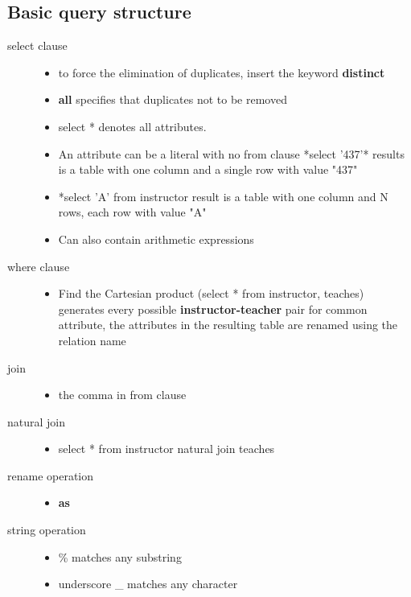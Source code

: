\documentclass[11pt]{article}
\begin{document}
\subsection{Basic query structure}
\label{sec-6-3}
\begin{description}
\item[{select clause}] \begin{itemize}
\item to force the elimination of duplicates, insert the keyword \textbf{distinct}
\item \textbf{all} specifies that duplicates not to be removed
\item select * denotes all attributes.
\item An attribute can be a literal with no from clause
*select '437'*
results is a table with one column and a single row with value "437"
\item *select 'A' from instructor
result is a table with one column and N rows, each row with value "A"
\item Can also contain arithmetic expressions
\end{itemize}
\item[{where clause}] \begin{itemize}
\item Find the Cartesian product (select * from instructor, teaches)
generates every possible \textbf{instructor-teacher} pair
for common attribute, the attributes in the resulting table are renamed using
the relation name
\end{itemize}
\item[{join}] \begin{itemize}
\item the comma in from clause
\end{itemize}
\item[{natural join}] \begin{itemize}
\item select * from instructor natural join teaches
\end{itemize}
\item[{rename operation}] \begin{itemize}
\item \textbf{as}
\end{itemize}
\item[{string operation}] \begin{itemize}
\item \% matches any substring
\item underscore \_ matches any character

\end{itemize}
\end{description}
\end{document}
